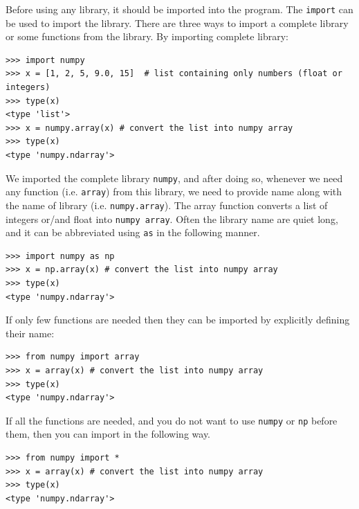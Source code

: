 \documentclass[10pt]{book}
\begin{document}
{Before using any library, it should be imported into the program. The \verb"import" can be used to import the library. There are three ways to import a complete library or some functions from the library. By importing complete library:
\beforeverb \begin{verbatim}
>>> import numpy
>>> x = [1, 2, 5, 9.0, 15]  # list containing only numbers (float or integers)
>>> type(x)
<type 'list'>
>>> x = numpy.array(x) # convert the list into numpy array
>>> type(x)
<type 'numpy.ndarray'>
\end{verbatim} \afterverb
We imported the complete library \verb"numpy", and after doing so, whenever we need any function (i.e. \verb"array") from this library, we need to provide name along with the name of library (i.e. \verb"numpy.array"). The array function converts a list of integers or/and float into \verb"numpy array". Often the library name are quiet long, and it can be abbreviated using \verb"as" in the following manner. 
\beforeverb \begin{verbatim}
>>> import numpy as np
>>> x = np.array(x) # convert the list into numpy array
>>> type(x)
<type 'numpy.ndarray'>
\end{verbatim} \afterverb

If only few functions are needed then they can be imported by explicitly defining their name:
\beforeverb \begin{verbatim}
>>> from numpy import array
>>> x = array(x) # convert the list into numpy array
>>> type(x) 
<type 'numpy.ndarray'>
\end{verbatim} \afterverb

If all the functions are needed, and you do not want to use \verb"numpy" or \verb"np" before them, then you can import in the following way.
\beforeverb \begin{verbatim}
>>> from numpy import *
>>> x = array(x) # convert the list into numpy array
>>> type(x) 
<type 'numpy.ndarray'>
\end{verbatim} \afterverb

}
\end{document}
